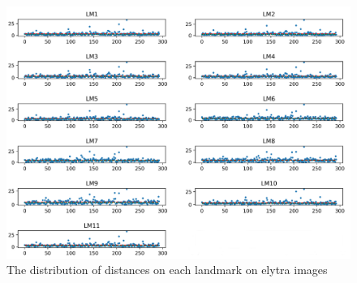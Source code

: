 \documentclass[review]{elsarticle}
\begin{document}
\begin{figure}[htbp]
    \centering
    \includegraphics[width=.95\textwidth]{images/charts/elytre_2.png}
    \caption{The distribution of distances on each landmark on elytra images}
    \label{dtelytre}
\end{figure}
\end{document}
